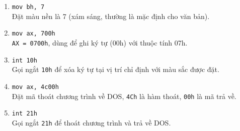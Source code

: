 \documentclass[12pt]{article}
\begin{document}
\begin{enumerate}[label=\textbf{\arabic*.}]
    \item \texttt{mov bh, 7} \\
    Đặt màu nền là 7 (xám sáng, thường là mặc định cho văn bản).
    
    \item \texttt{mov ax, 700h} \\
    \texttt{AX = 0700h}, dùng để ghi ký tự (00h) với thuộc tính 07h.
    
    \item \texttt{int 10h} \\
    Gọi ngắt \texttt{10h} để xóa ký tự tại vị trí chỉ định với màu sắc được đặt.
    
    \item \texttt{mov ax, 4c00h} \\
    Đặt mã thoát chương trình về DOS, \texttt{4Ch} là hàm thoát, \texttt{00h} là mã trả về.
    
    \item \texttt{int 21h} \\
    Gọi ngắt \texttt{21h} để thoát chương trình và trả về DOS.
\end{enumerate}
\end{document}
